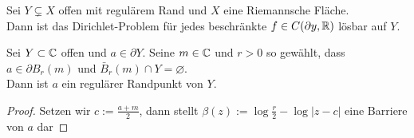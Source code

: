 \begin{thm}
  \label{thm:dirichlet}
  Sei $Y \subsetneq X$ offen mit regulärem Rand und $X$ eine
  Riemannsche Fläche. \\
  Dann ist das Dirichlet-Problem für jedes beschränkte $f \in
  C(\partial y, \mathbb{R})$ lösbar auf $Y$.
\end{thm}

\begin{thm}
  \label{thm:reg-rand}
  Sei $Y \subset \mathbb{C}$ offen und $a \in \partial Y$. Seine $m \in \mathbb{C}$
  und $r > 0$ so gewählt, dass $a \in \partial B_r(m)$ und $\bar
  B_r(m) \cap Y = \varnothing$.\\
  Dann ist $a$ ein regulärer Randpunkt von $Y$.
\end{thm}

\begin{proof}
  Setzen wir $c := \frac{a+m}{2}$, dann stellt $\beta(z) := \log
  \frac{r}{2} - \log|z-c|$ eine Barriere von $a$ dar
\end{proof}



